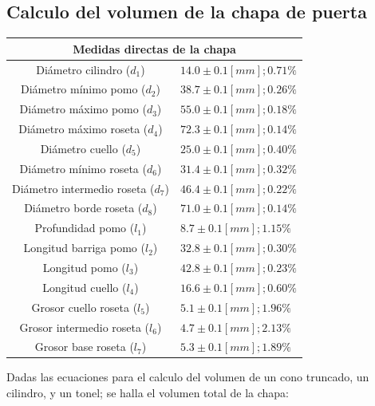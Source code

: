 \documentclass[letter,11pt]{article}
\begin{document}
\subsection{Calculo del volumen de la chapa de puerta}
\vspace*{0.25cm}
\begin{center}
\begin{tabular}{|c|>{\centering}m{5.0cm}<{\centering}|}
\hline
\multicolumn{2}{|c|}{\textbf{Medidas directas de la chapa}}
\tabularnewline \hline
         Diámetro cilindro ($d_1$) & $14.0 \pm 0.1 [mm]; 0.71\%$
\tabularnewline \hline
      Diámetro mínimo pomo ($d_2$) & $38.7 \pm 0.1 [mm]; 0.26\%$
\tabularnewline \hline
      Diámetro máximo pomo ($d_3$) & $55.0 \pm 0.1 [mm]; 0.18\%$
\tabularnewline \hline
    Diámetro máximo roseta ($d_4$) & $72.3 \pm 0.1 [mm]; 0.14\%$
\tabularnewline \hline
           Diámetro cuello ($d_5$) & $25.0 \pm 0.1 [mm]; 0.40\%$
\tabularnewline \hline
    Diámetro mínimo roseta ($d_6$) & $31.4 \pm 0.1 [mm]; 0.32\%$
\tabularnewline \hline
Diámetro intermedio roseta ($d_7$) & $46.4 \pm 0.1 [mm]; 0.22\%$
\tabularnewline \hline
     Diámetro borde roseta ($d_8$) & $71.0 \pm 0.1 [mm]; 0.14\%$
\tabularnewline \hline
          Profundidad pomo ($l_1$) & $ 8.7 \pm 0.1 [mm]; 1.15\%$
\tabularnewline \hline
     Longitud barriga pomo ($l_2$) & $32.8 \pm 0.1 [mm]; 0.30\%$
\tabularnewline \hline
             Longitud pomo ($l_3$) & $42.8 \pm 0.1 [mm]; 0.23\%$
\tabularnewline \hline
           Longitud cuello ($l_4$) & $16.6 \pm 0.1 [mm]; 0.60\%$
\tabularnewline \hline
      Grosor cuello roseta ($l_5$) & $ 5.1 \pm 0.1 [mm]; 1.96\%$
\tabularnewline \hline
  Grosor intermedio roseta ($l_6$) & $ 4.7 \pm 0.1 [mm]; 2.13\%$
\tabularnewline \hline
        Grosor base roseta ($l_7$) & $ 5.3 \pm 0.1 [mm]; 1.89\%$
\tabularnewline \hline
\end{tabular}
\end{center}

Dadas las ecuaciones para el calculo del volumen de un cono truncado, un
cilindro, y un tonel; se halla el volumen total de la chapa:
\end{document}
